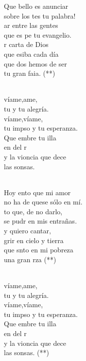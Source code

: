 \documentclass[12pt]{article}
\begin{document}
\begin{multicols*}{2}
\begin{cancion}%
	Que bello es anunciar \\
	sobre los tes tu palabra!\\
	ar entre las gentes \\
	que es pe tu evangelio.\\
	r carta de Dios\\
	que esiba cada día\\
	que dos hemos de ser \\
	tu gran faia. (**)\\\jump\\
	\begin{chorus}%
	víame,ame, \\
	tu y tu alegría.\\
	víame,víame,\\
	tu impso y tu esperanza.\\
	Que embre tu illa\\
	en  del r\\
	y la vioncia que dece \\
	las sonsas.\\
	\end{chorus}%
	\jump\\
	Hoy ento que mi amor \\
	no ha de quese sólo en mí.\\
	to que, de no darlo,\\
	se pudr en mis entrañas.\\
	y quiero cantar,\\
	grir en cielo y tierra\\
	que snto en mi pobreza \\
	una gran rza (**)\\\jump\\
	\begin{chorus}%
	víame,ame, \\
	tu y tu alegría.\\
	víame,víame,\\
	tu impso y tu esperanza.\\
	Que embre tu illa\\
	en  del r\\
	y la vioncia que dece \\
	las sonsas. (**)\\
	\end{chorus}%
	\jump\\
\end{cancion}%


\end{multicols*}
\end{document}
